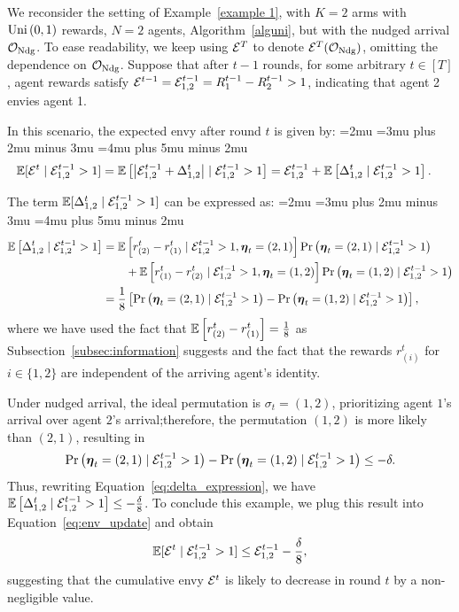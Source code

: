 \begin{example}  \label{example: envy with sugg}
We reconsider the setting of Example~\ref{example 1}, with $K=2$ arms with  $\text{Uni}\left(0,1\right)$ rewards, $N=2$ agents, Algorithm~\ref{alguni}, but with the nudged arrival ${\mathcal O_{\textnormal{Ndg}}}$. To ease readability, we keep using $\mathcal{E}^T$ to denote $\mathcal{E}^T({\mathcal O_{\textnormal{Ndg}}})$, omitting the dependence on  ${\mathcal O_{\textnormal{Ndg}}}$. Suppose that after $t-1$ rounds, for some arbitrary $t \in [T]$, agent rewards satisfy $\mathcal{E}^{t-1} =\mathcal{E}^{t-1}_{1,2} = R^{t-1}_1 - R^{t-1}_2 > 1$, indicating that agent 2 envies agent 1.


In this scenario, the expected envy after round $t$ is given by:  
{  
\thinmuskip=2mu  
\medmuskip=3mu plus 2mu minus 3mu  
\thickmuskip=4mu plus 5mu minus 2mu  
\begin{align}\label{eq:env_update}  
\mathbb{E}[\mathcal{E}^t \mid \mathcal{E}^{t-1}_{1,2} > 1]  
&= \mathbb{E}\left[\left| \mathcal{E}^{t-1}_{1,2} + \Delta^t_{1,2} \right| \mid \mathcal{E}^{t-1}_{1,2} > 1 \right] = \mathcal{E}^{t-1}_{1,2} + \mathbb{E}\left[\Delta^t_{1,2} \mid\mathcal{E}^{t-1}_{1,2} > 1 \right]. 
\end{align}  
}  



The term $\mathbb{E}[\Delta^t_{1,2} \mid \mathcal{E}^{t-1}_{1,2} > 1 ]$ can be expressed as:  
{  
\thinmuskip=2mu  
\medmuskip=3mu plus 2mu minus 3mu  
\thickmuskip=4mu plus 5mu minus 2mu  
\begin{align}\label{eq:delta_expression}  
\mathbb{E}\left[ \Delta^t_{1,2} \mid \mathcal{E}^{t-1}_{1,2} > 1 \right] &= \mathbb{E}\left[ r_{(2)}^t - r_{(1)}^t \mid \mathcal{E}^{t-1}_{1,2} > 1, \boldsymbol{\eta}_t = (2,1) \right]\Pr\left( \boldsymbol{\eta}_t = (2,1) \mid \mathcal{E}^{t-1}_{1,2} > 1 \right) \nonumber \\  
& \qquad + \mathbb{E}\left[ r_{(1)}^t - r_{(2)}^t \mid \mathcal{E}^{t-1}_{1,2} > 1, \boldsymbol{\eta}_t  = (1,2) \right]\Pr\left( \boldsymbol{\eta}_t = (1,2) \mid \mathcal{E}^{t-1}_{1,2} > 1 \right) \nonumber\\
&= \frac{1}{8} \left[\Pr\left( \boldsymbol{\eta}_t = (2,1) \mid \mathcal{E}^{t-1}_{1,2} > 1 \right) - \Pr\left( \boldsymbol{\eta}_t = (1,2) \mid \mathcal{E}^{t-1}_{1,2} > 1 \right) \right],  
\end{align}  
}%
where we have used the fact that $\mathbb{E}\left[ r_{(2)}^t - r_{(1)}^t \right] = \frac{1}{8}$ as Subsection~\ref{subsec:information} suggests and the fact that the rewards $r_{(i)}^t$ for $i\in \{1,2 \}$ are independent of the arriving agent's identity.

Under nudged arrival, the ideal permutation is $\sigma_t = (1,2)$, prioritizing agent $1$'s arrival over agent $2$'s arrival;therefore, the permutation $(1,2)$ is more likely than $(2,1)$, resulting in
\[
\Pr\left( \boldsymbol{\eta}_t = (2,1) \mid \mathcal{E}^{t-1}_{1,2} > 1 \right) - \Pr\left( \boldsymbol{\eta}_t = (1,2) \mid \mathcal{E}^{t-1}_{1,2} > 1 \right) \leq -\delta.
\]  
Thus, rewriting Equation~\eqref{eq:delta_expression}, we have $\mathbb{E}\left[ \Delta^t_{1,2} \mid \mathcal{E}^{t-1}_{1,2} > 1 \right]  \leq -\frac{\delta}{8}$. To conclude this example, we plug this result into Equation~\eqref{eq:env_update} and obtain
\[
\mathbb{E}[\mathcal{E}^t \mid \mathcal{E}^{t-1}_{1,2} > 1] \leq \mathcal{E}^{t-1}_{1,2}-\frac{\delta}{8},
\]
suggesting that the cumulative envy $\mathcal{E}^t$ is likely to decrease in round $t$ by a non-negligible value.
\end{example}
